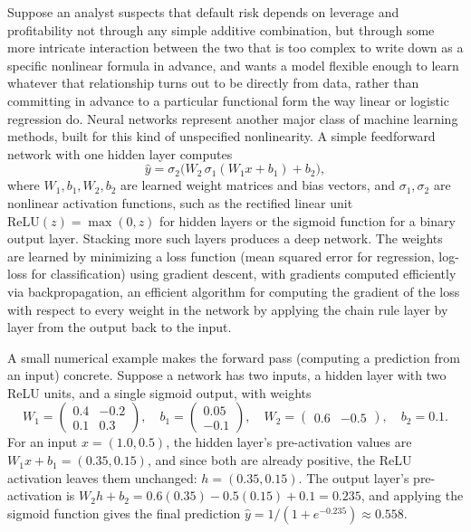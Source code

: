 \documentclass[../ai_in_finance]{subfiles}
\begin{document}
Suppose an analyst suspects that default risk depends on leverage and profitability not through any simple additive combination, but through some more intricate interaction between the two that is too complex to write down as a specific nonlinear formula in advance, and wants a model flexible enough to learn whatever that relationship turns out to be directly from data, rather than committing in advance to a particular functional form the way linear or logistic regression do. Neural networks represent another major class of machine learning methods, built for this kind of unspecified nonlinearity. A simple feedforward network with one hidden layer computes
\begin{equation*}
\hat y = \sigma_2\big(W_2\, \sigma_1(W_1 x + b_1) + b_2\big),
\end{equation*}
where $W_1, b_1, W_2, b_2$ are learned weight matrices and bias vectors, and $\sigma_1, \sigma_2$ are nonlinear activation functions, such as the rectified linear unit $\text{ReLU}(z) = \max(0,z)$ for hidden layers or the sigmoid function for a binary output layer. Stacking more such layers produces a deep network. The weights are learned by minimizing a loss function (mean squared error for regression, log-loss for classification) using gradient descent, with gradients computed efficiently via backpropagation, an efficient algorithm for computing the gradient of the loss with respect to every weight in the network by applying the chain rule layer by layer from the output back to the input.

A small numerical example makes the forward pass (computing a prediction from an input) concrete. Suppose a network has two inputs, a hidden layer with two ReLU units, and a single sigmoid output, with weights
\begin{equation*}
W_1 = \begin{pmatrix} 0.4 & -0.2 \\ 0.1 & 0.3 \end{pmatrix}, \quad b_1 = \begin{pmatrix} 0.05 \\ -0.1 \end{pmatrix}, \quad W_2 = \begin{pmatrix} 0.6 & -0.5 \end{pmatrix}, \quad b_2 = 0.1.
\end{equation*}
For an input $x = (1.0, 0.5)$, the hidden layer's pre-activation values are $W_1 x + b_1 = (0.35, 0.15)$, and since both are already positive, the ReLU activation leaves them unchanged: $h = (0.35, 0.15)$. The output layer's pre-activation is $W_2 h + b_2 = 0.6(0.35) - 0.5(0.15) + 0.1 = 0.235$, and applying the sigmoid function gives the final prediction $\hat y = 1/(1+e^{-0.235}) \approx 0.558$.
\end{document}
